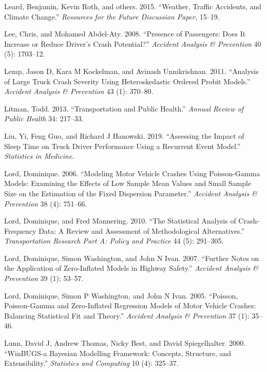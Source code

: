\documentclass[12pt]{book}
\numberwithin{equation}{chapter}
\begin{document}
\leavevmode\hypertarget{ref-leard2015weather}{}%
Leard, Benjamin, Kevin Roth, and others. 2015. ``Weather, Traffic Accidents, and Climate Change.'' \emph{Resources for the Future Discussion Paper}, 15--19.

\leavevmode\hypertarget{ref-lee2008presence}{}%
Lee, Chris, and Mohamed Abdel-Aty. 2008. ``Presence of Passengers: Does It Increase or Reduce Driver's Crash Potential?'' \emph{Accident Analysis \& Prevention} 40 (5): 1703--12.

\leavevmode\hypertarget{ref-lemp2011analysis}{}%
Lemp, Jason D, Kara M Kockelman, and Avinash Unnikrishnan. 2011. ``Analysis of Large Truck Crash Severity Using Heteroskedastic Ordered Probit Models.'' \emph{Accident Analysis \& Prevention} 43 (1): 370--80.

\leavevmode\hypertarget{ref-litman2013transportation}{}%
Litman, Todd. 2013. ``Transportation and Public Health.'' \emph{Annual Review of Public Health} 34: 217--33.

\leavevmode\hypertarget{ref-liu2019assessing}{}%
Liu, Yi, Feng Guo, and Richard J Hanowski. 2019. ``Assessing the Impact of Sleep Time on Truck Driver Performance Using a Recurrent Event Model.'' \emph{Statistics in Medicine}.

\leavevmode\hypertarget{ref-lord2006modeling}{}%
Lord, Dominique. 2006. ``Modeling Motor Vehicle Crashes Using Poisson-Gamma Models: Examining the Effects of Low Sample Mean Values and Small Sample Size on the Estimation of the Fixed Dispersion Parameter.'' \emph{Accident Analysis \& Prevention} 38 (4): 751--66.

\leavevmode\hypertarget{ref-lord2010statistical}{}%
Lord, Dominique, and Fred Mannering. 2010. ``The Statistical Analysis of Crash-Frequency Data: A Review and Assessment of Methodological Alternatives.'' \emph{Transportation Research Part A: Policy and Practice} 44 (5): 291--305.

\leavevmode\hypertarget{ref-lord2007further}{}%
Lord, Dominique, Simon Washington, and John N Ivan. 2007. ``Further Notes on the Application of Zero-Inflated Models in Highway Safety.'' \emph{Accident Analysis \& Prevention} 39 (1): 53--57.

\leavevmode\hypertarget{ref-lord2005poisson}{}%
Lord, Dominique, Simon P Washington, and John N Ivan. 2005. ``Poisson, Poisson-Gamma and Zero-Inflated Regression Models of Motor Vehicle Crashes: Balancing Statistical Fit and Theory.'' \emph{Accident Analysis \& Prevention} 37 (1): 35--46.

\leavevmode\hypertarget{ref-lunn2000winbugs}{}%
Lunn, David J, Andrew Thomas, Nicky Best, and David Spiegelhalter. 2000. ``WinBUGS-a Bayesian Modelling Framework: Concepts, Structure, and Extensibility.'' \emph{Statistics and Computing} 10 (4): 325--37.
\end{document}
